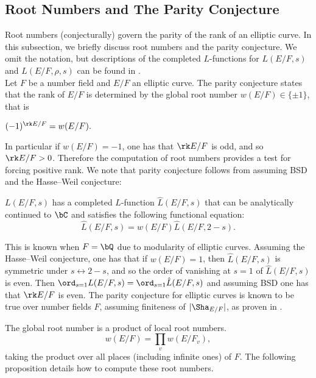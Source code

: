 \subsection{Root Numbers and The Parity Conjecture}

Root numbers (conjecturally) govern the parity of the rank of an elliptic curve. In this subsection, we briefly discuss root numbers and the parity conjecture. %
We omit the notation, but descriptions of the completed $L$-functions for $L(E / F, s)$ and $L(E / F, \rho, s)$ can be found in \cite[$\S$2.5]{DEW1}.\\


Let $F$ be a number field and $E / F$ an elliptic curve. The parity conjecture states that the rank of $E / F$ is determined by the global root number $w(E / F) \in \{ \pm 1 \}$, that is

\begin{conj}\label{parity}
    $(-1)^{\rk E / F} = w(E / F).$
\end{conj}

In particular if $w(E / F) = -1$, one has that $\rk E / F$ is odd, and so $\rk E / F > 0$. Therefore the computation of root numbers provides a test for forcing positive rank. We note that parity conjecture follows from assuming BSD and the Hasse--Weil conjecture: 

\begin{conj}
    $L(E / F, s)$ has a completed $L$-function 
    $\hat{L}(E / F, s)$ that can be analytically continued to $\bC$ and satisfies the following functional equation:
    \[ \hat{L}(E / F, s) = w(E / F) \hat{L}(E / F, 2- s) .\]
\end{conj}

This is known when $F = \bQ$ due to modularity of elliptic curves. Assuming the Hasse--Weil conjecture, one has that if $w(E / F) = 1$, then $\hat{L}(E / F, s)$ is symmetric under $s \leftrightarrow 2 - s$, and so the order of vanishing at $s = 1$ of $\hat{L}(E / F, s)$ is even. Then $\ord_{s = 1} L(E / F, s) = \ord_{s = 1}\hat{L}(E / F, s)$ and assuming BSD one has that $\rk E / F$ is even. 
The parity conjecture for elliptic curves is known to be true over number fields $F$, assuming finiteness of $|\Sha_{E / F}|$, as proven in \cite{TimVlad}.

The global root number is a product of local root numbers. 
\[ w(E / F) = \prod_v w(E / F_v), \]
taking the product over all places (including infinite ones) of $F$. 
The following proposition details how to compute these root numbers. 

